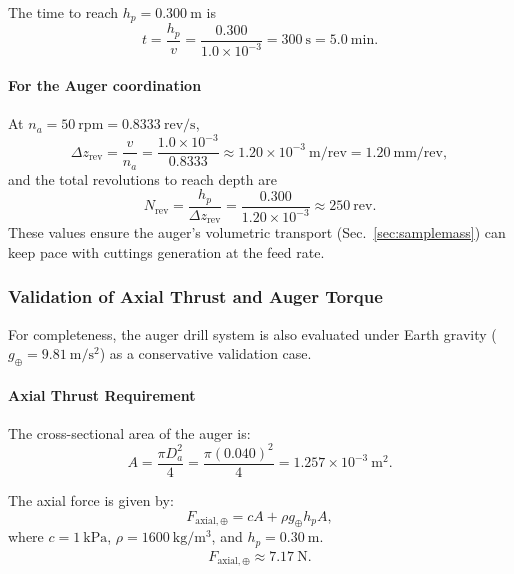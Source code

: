 \documentclass[letterpaper, 10 pt, conference]{ieeeconf}  %
\begin{document}
The time to reach \(h_p=0.300~\mathrm{m}\) is
\begin{equation}
t = \frac{h_p}{v} = \frac{0.300}{1.0\times10^{-3}} = 300~\mathrm{s} = 5.0~\mathrm{min}. \label{eq:t}
\end{equation}

\paragraph{For the Auger coordination}
At \(n_a=50~\mathrm{rpm}=0.8333~\mathrm{rev/s}\),
\begin{equation}
\Delta z_{\mathrm{rev}} = \frac{v}{n_a} = \frac{1.0\times10^{-3}}{0.8333} \approx 1.20\times10^{-3}~\mathrm{m/rev}=1.20~\mathrm{mm/rev}, \label{eq:dz}
\end{equation}
and the total revolutions to reach depth are
\begin{equation}
N_{\mathrm{rev}} = \frac{h_p}{\Delta z_{\mathrm{rev}}} = \frac{0.300}{1.20\times10^{-3}} \approx 250~\mathrm{rev}. \label{eq:Nrev}
\end{equation}
These values ensure the auger’s volumetric transport (Sec.~\ref{sec:samplemass}) can keep pace with cuttings generation at the feed rate.

\subsubsection{Validation of Axial Thrust and Auger Torque}

For completeness, the auger drill system is also evaluated under Earth gravity
(\(g_\oplus = 9.81~\mathrm{m/s^2}\)) as a conservative validation case.

\paragraph{Axial Thrust Requirement}

The cross-sectional area of the auger is:
\begin{equation}
    A = \frac{\pi D_a^2}{4} 
      = \frac{\pi (0.040)^2}{4} 
      = 1.257 \times 10^{-3}~\mathrm{m^2}.
\end{equation}

The axial force is given by:
\begin{equation}
    F_{\mathrm{axial},\oplus} = cA + \rho g_\oplus h_p A,
\end{equation}
where \(c=1~\mathrm{kPa}\), \(\rho=1600~\mathrm{kg/m^3}\), and \(h_p=0.30~\mathrm{m}\).
\begin{align}
    F_{\mathrm{axial},\oplus} \approx 7.17~\mathrm{N}.
\end{align}
\end{document}
